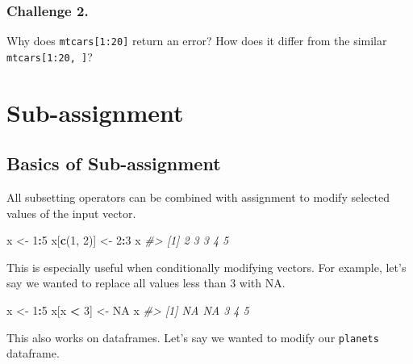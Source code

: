 \documentclass[]{book}
\newenvironment{Shaded}{\begin{snugshade}}{\end{snugshade}}
\newcommand{\KeywordTok}[1]{\textcolor[rgb]{0.13,0.29,0.53}{\textbf{#1}}}
\newcommand{\DecValTok}[1]{\textcolor[rgb]{0.00,0.00,0.81}{#1}}
\newcommand{\StringTok}[1]{\textcolor[rgb]{0.31,0.60,0.02}{#1}}
\newcommand{\CommentTok}[1]{\textcolor[rgb]{0.56,0.35,0.01}{\textit{#1}}}
\newcommand{\OtherTok}[1]{\textcolor[rgb]{0.56,0.35,0.01}{#1}}
\newcommand{\OperatorTok}[1]{\textcolor[rgb]{0.81,0.36,0.00}{\textbf{#1}}}
\newcommand{\NormalTok}[1]{#1}
\begin{document}
\subsubsection*{Challenge 2.}\label{challenge-2.-4}

Why does \texttt{mtcars{[}1:20{]}} return an error? How does it differ
from the similar \texttt{mtcars{[}1:20,\ {]}}?

\section{Sub-assignment}\label{sub-assignment}

\subsection{Basics of Sub-assignment}\label{basics-of-sub-assignment}

All subsetting operators can be combined with assignment to modify
selected values of the input vector.

\begin{Shaded}
\begin{Highlighting}[]
\NormalTok{x <-}\StringTok{ }\DecValTok{1}\OperatorTok{:}\DecValTok{5}
\NormalTok{x[}\KeywordTok{c}\NormalTok{(}\DecValTok{1}\NormalTok{, }\DecValTok{2}\NormalTok{)] <-}\StringTok{ }\DecValTok{2}\OperatorTok{:}\DecValTok{3}
\NormalTok{x}
\CommentTok{#> [1] 2 3 3 4 5}
\end{Highlighting}
\end{Shaded}

This is especially useful when conditionally modifying vectors. For
example, let's say we wanted to replace all values less than 3 with NA.

\begin{Shaded}
\begin{Highlighting}[]
\NormalTok{x <-}\StringTok{ }\DecValTok{1}\OperatorTok{:}\DecValTok{5}
\NormalTok{x[x }\OperatorTok{<}\StringTok{ }\DecValTok{3}\NormalTok{] <-}\StringTok{ }\OtherTok{NA}
\NormalTok{x}
\CommentTok{#> [1] NA NA  3  4  5}
\end{Highlighting}
\end{Shaded}

This also works on dataframes. Let's say we wanted to modify our
\texttt{planets} dataframe.
\end{document}
